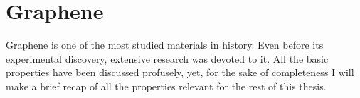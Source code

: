 \chapter{Graphene}
\label{ch:graphene}

Graphene is one of the most studied materials in history\cite{KatsnelsonBook, Geim2007, Murakami2009, CastroNeto2009a,
Mas-Balleste2011, Konschuh2011a, Cooper2012, Han2014, Sadurni2014, Rozhkov2016}.
Even before its experimental discovery\cite{Novoselov2004, Novoselov2005},
extensive research was devoted to it\cite{Wallace1947, VanBommel1975, Semenoff1984, Haldane1988, Forbeaux1998, Oshima2000}.
All the basic properties have been discussed profusely, yet, for the sake of completeness I will make a brief recap of all the properties relevant for the rest of this thesis.\\

